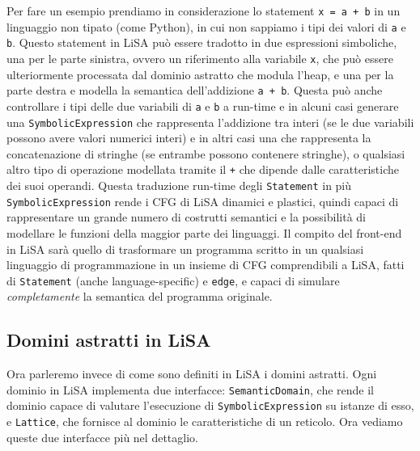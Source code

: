 Per fare un esempio prendiamo in considerazione lo statement \texttt{x = a + b} in un linguaggio non tipato (come Python), in cui non sappiamo i tipi dei valori di \texttt{a} e \texttt{b}. Questo statement in LiSA può essere tradotto in due espressioni simboliche, una per le parte sinistra, ovvero un riferimento alla variabile \texttt{x}, che può essere ulteriormente processata dal dominio astratto che modula l'heap, e una per la parte destra e modella la semantica dell'addizione \texttt{a + b}. Questa può anche controllare i tipi delle due variabili di \texttt{a} e \texttt{b} a run-time e in alcuni casi generare una \texttt{SymbolicExpression} che rappresenta l'addizione tra interi (se le due variabili possono avere valori numerici interi) e in altri casi una che rappresenta la concatenazione di stringhe (se entrambe possono contenere stringhe), o qualsiasi altro tipo di operazione modellata tramite il \texttt{+} che dipende dalle caratteristiche dei suoi operandi.
Questa traduzione run-time degli \texttt{Statement} in più \texttt{SymbolicExpression} rende i CFG di LiSA dinamici e plastici, quindi capaci di rappresentare un grande numero di costrutti semantici e la possibilità di modellare le funzioni della maggior parte dei linguaggi. Il compito del front-end in LiSA sarà quello di trasformare un programma scritto in un qualsiasi linguaggio di programmazione in un insieme di CFG comprendibili a LiSA, fatti di \texttt{Statement} (anche language-specific) e \texttt{edge}, e capaci di simulare \textit{completamente} la semantica del programma originale.

\subsection{Domini astratti in LiSA}\label{sec:abstractDomainLiSA}
Ora parleremo invece di come sono definiti in LiSA i domini astratti. Ogni dominio in LiSA implementa due interfacce: \texttt{SemanticDomain}, che rende il dominio capace di valutare l'esecuzione di \texttt{SymbolicExpression} su istanze di esso, e \texttt{Lattice}, che fornisce al dominio le caratteristiche di un reticolo. Ora vediamo queste due interfacce più nel dettaglio.

